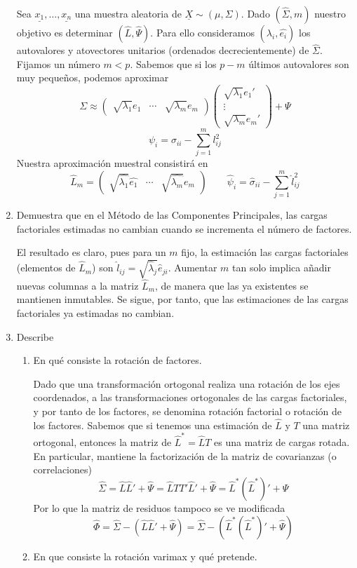 \documentclass[twoside]{article}
\newcommand{\muestra}[1]{{\underline{#1}}}
\newcommand{\mX}{{\muestra{X}}}
\begin{document}
\begin{enumerate}
Sea $\muestra{x_1},\dotsc,\muestra{x_n}$ una muestra aleatoria de $\mX\sim (\mu,\Sigma)$. Dado $(\hat{\Sigma},m)$ nuestro objetivo es determinar $(\hat{L},\hat{\Psi})$. Para ello consideramos $(\hat{\lambda_i},\hat{e_i})$ los autovalores y atovectores unitarios (ordenados decrecientemente) de $\hat{\Sigma}$. Fijamos un número $m<p$. Sabemos que si los $p-m$ últimos autovalores son muy pequeños, podemos aproximar
$$
\Sigma  \approx \begin{pmatrix}
\sqrt{\lambda_1}e_1 & \cdots & \sqrt{\lambda_m}e_m 
\end{pmatrix}
\begin{pmatrix}
\sqrt{\lambda_1}e_1' \\ \vdots \\ \sqrt{\lambda_m}e_m'
\end{pmatrix} + \Psi
$$
$$
\psi_i = \sigma_{ii}-\sum_{j=1}^m l_{ij}^2
$$
Nuestra aproximación muestral consistirá en $$\hat{L}_m=\begin{pmatrix}
\sqrt{\hat{\lambda_1}}\hat{e_1} & \cdots & \sqrt{\hat{\lambda_m}}\hat{e_m}\end{pmatrix} \qquad 	\hat{\psi}_i = \hat{\sigma}_{ii}-\sum_{j=1}^m \hat{l}_{ij}^2
$$
\item Demuestra que en el Método de las Componentes Principales, las cargas factoriales estimadas no cambian cuando se incrementa el número de factores.

El resultado es claro, pues para un $m$ fijo, la estimación las cargas factoriales (elementos de $\hat{L}_m$) son $\hat{l}_{ij}=\sqrt{\hat{\lambda}_j}\hat{e}_{ji}$. Aumentar $m$ tan solo implica añadir nuevas columnas a la matriz $\hat{L}_m$, de manera que las ya existentes se mantienen inmutables. Se sigue, por tanto, que las estimaciones de las cargas factoriales ya estimadas no cambian.
\item Describe
\begin{enumerate}
	\item En qué consiste la rotación de factores.

	Dado que una transformación ortogonal realiza una rotación de los ejes coordenados, a las transformaciones ortogonales de las cargas factoriales, y por tanto de los factores, se denomina rotación factorial o rotación de los factores. Sabemos que si tenemos una estimación de $\hat{L}$ y $T$ una matriz ortogonal, entonces la matriz de $\hat{L}^* = \hat{L}T$ es una matriz de cargas rotada. En particular, mantiene la factorización de la matriz de covarianzas (o correlaciones)
	$$
	\hat{\Sigma} = \hat{L}\hat{L}' + \hat{\Psi} = \hat{L}TT'\hat{L}' + \hat{\Psi} = \hat{L}^*(\hat{L}^*)'+\Psi
	$$ 
Por lo que la matriz de residuos tampoco se ve modificada
$$
\hat{\Phi} = \hat{\Sigma} -( \hat{L}\hat{L}' + \hat{\Psi}) =  \hat{\Sigma} -(\hat{L}^*(\hat{L}^*)' + \hat{\Psi})
$$
	\item En que consiste la rotación varimax y qué pretende.
	

\end{enumerate}
\end{enumerate}
\end{document}
